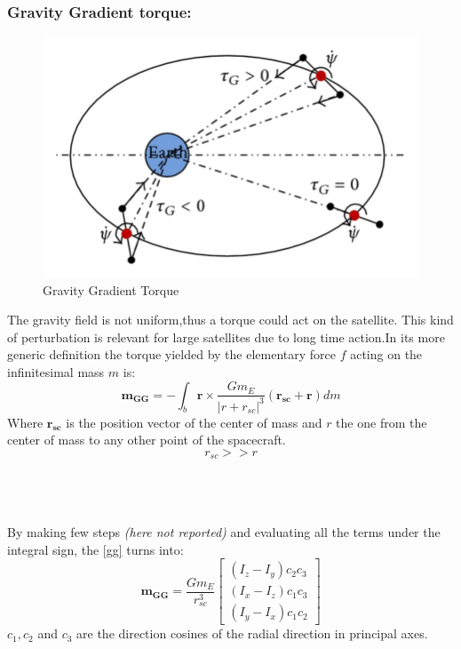 \documentclass[11pt]{article}
\begin{document}
\subsubsection{Gravity Gradient torque:}
\begin{minipage}{.5\textwidth}
\begin{figure} [H]
\centering 
\includegraphics[scale=1]{GG.png}
\caption{ Gravity Gradient Torque
\cite{GG}}
\end{figure}
\end{minipage}
\begin{minipage}{.5\textwidth}
The gravity field is not uniform,thus a torque could act on the satellite. This kind of perturbation is relevant for large satellites due to long time action.In its more generic definition the torque yielded by the elementary force $f$ acting on the infinitesimal mass $m$ is:
\begin{equation}
\mathbf{m_{GG}}=- \int_b  \mathbf{r} \times \frac{Gm_E}{|r+r_{sc}|^3}(\mathbf{r_{sc}}+\mathbf{r})dm
\label{gg}
\end{equation}
Where $\mathbf{r_{sc}}$ is the position vector of the center of mass and $r$ the one from the center of mass to any other point of the spacecraft.
\begin{equation}
r_{sc} >> r
\end{equation}

\end{minipage}\\\\\\
By making few steps \textit{(here not reported)} and evaluating all the terms under the integral sign, the \ref{gg} turns into:
\begin{equation}
\mathbf{m_{GG}}= \frac{Gm_E}{r_{sc}^3}\begin{bmatrix}
(I_z-I_y)c_2c_3\\
(I_x-I_z)c_1c_3\\
(I_y-I_x)c_1c_2
\end{bmatrix}
\end{equation}
$c_1,c_2$ and $c_3$ are the direction cosines of the radial direction in principal axes.
\end{document}
